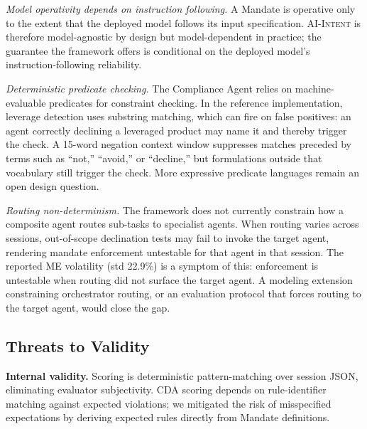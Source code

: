 \documentclass[runningheads]{llncs}
\begin{document}
\textit{Model operativity depends on instruction following.} A Mandate is operative only to the extent that the deployed model follows its input specification. 
\textsc{AI-Intent} is therefore model-agnostic by design but model-dependent in practice; the guarantee the framework offers is conditional on the deployed model's instruction-following reliability.

\textit{Deterministic predicate checking.} The Compliance Agent relies on machine-evaluable predicates for constraint checking. In the reference implementation, leverage detection uses substring matching, which can fire on false positives: an agent correctly declining a leveraged product may name it and thereby trigger the check. 
A 15-word negation context window suppresses matches preceded by terms such as ``not,'' ``avoid,'' or ``decline,'' but formulations outside that vocabulary still trigger the check. More expressive predicate languages remain an open design question.

\textit{Routing non-determinism.} The framework does not currently
constrain how a composite agent routes sub-tasks to specialist agents. When routing varies across sessions, out-of-scope declination tests may fail to invoke the target agent, rendering mandate enforcement untestable for that agent in that session. 
The reported ME volatility (std 22.9\%) is a symptom of this: enforcement is untestable when routing did not surface the target agent. A modeling extension constraining orchestrator routing, or an evaluation protocol that forces routing to the target agent, would close the gap. 


\subsection{Threats to Validity}

\textbf{Internal validity.} Scoring is deterministic pattern-matching over session JSON, eliminating evaluator subjectivity. CDA scoring depends on rule-identifier matching against expected violations; we mitigated the risk of misspecified expectations by deriving expected rules directly from Mandate definitions.
\end{document}
